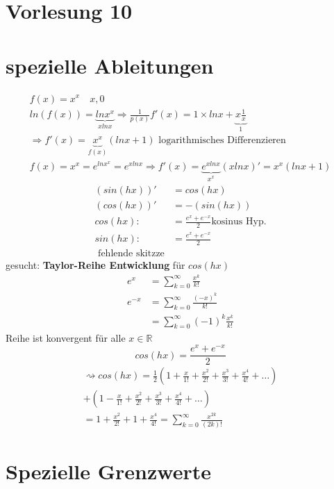 \section{Vorlesung 10}
\section{spezielle Ableitungen }
\begin{gather*}
f(x) = x^x \quad x,0\\
ln(f(x)) = \underbrace{ln x^x}_{x ln x } \Rightarrow \frac{1}{p(x)}f'(x) = 1 \times lnx + \underbrace{x \frac{1}{x}}_{1}\\
\Rightarrow f'(x) = \underbrace{x^x }_{f(x)}(ln x + 1) \text{ logarithmisches Differenzieren }\\
f(x) = x^x = e^{lnx^x} = e^{xlnx} \Rightarrow f'(x)= \underbrace{e^{xlnx}}_{x^x}(xlnx)' = x^x (lnx + 1) 
\end{gather*}
\begin{align*}
(sin(hx))'&= cos(hx)\\
(cos(hx))'&= -(sin(hx))\\
cos(hx):&= \frac{e^x + e^{-x}}{2} \text{kosinus Hyp.}\\
sin(hx):&= \frac{e^x + e^{-x}}{2}\\
\text{ fehlende skitzze}
\end{align*}
gesucht: \textbf{Taylor-Reihe Entwicklung} für $cos(hx)$\\
\begin{align*}
e^x &= \sum_{ k = 0 }^{ \infty }{ \frac{x^k}{k!} }\\
e^{-x} &= \sum_{ k = 0 }^{\infty}{\frac{(-x)^k}{k!}}\\
&= \sum_{ k = 0 }^{\infty}{(-1)^k\frac{x^k}{k!}}
\end{align*}
Reihe ist konvergent für alle $ x \in \mathbb{R}$ \\
\[cos(hx) = \frac{e^x + e^{-x}}{2}\]
\begin{gather*}
\rightsquigarrow cos(hx)= \frac{1}{2}(1+\frac{x}{1!}+ \frac{x^2}{2!} + \frac{x^3}{3!}+\frac{x^4}{4!} + \dots )\\
+(1-\frac{x}{1!}+ \frac{x^2}{2!} + \frac{x^3}{3!}+\frac{x^4}{4!} + \dots)\\
=1 + \frac{x^2}{2!}+ 1 + \frac{x^4}{4!} = \sum_{k=0}^{\infty}{\frac{x^{2k}}{(2k)!}}
\end{gather*}
\section{Spezielle Grenzwerte}
